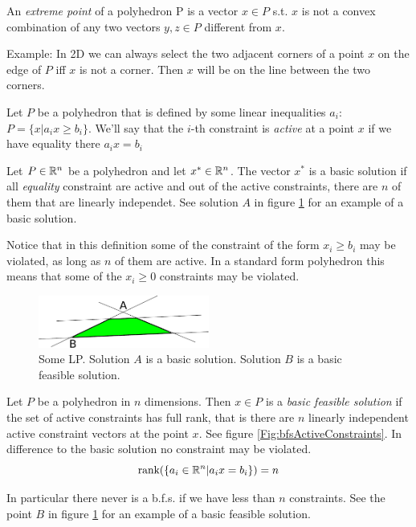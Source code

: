 \begin{Def}\label{Def:ExtremePoint} An \emph{extreme point} of a polyhedron P is a vector $x\in P$ s.t. $x$ is not a convex combination of any two vectors $y,z\in P$ different from $x$. 
\end{Def}
Example: In 2D we can always select the two adjacent corners of a point $x$ on the edge of $P$ iff $x$ is not a corner. Then $x$ will be on the line between the two corners. 

\begin{Def}\label{Def:ActiveConstraint} Let $P$ be a polyhedron that is defined by some linear inequalities $a_i$: $P=\{x|a_ix\geq b_i\}$. We'll say that the $i$-th constraint is \emph{active} at a point $x$ if we have equality there $a_ix = b_i$
\end{Def}
%
\begin{Def}\label{Def:BasicSolution}Let $P\in \mathbb{R}^n$ be a polyhedron and let $x^{*}\in \mathbb{R}^n$. The vector $x^{*}$ is a basic solution if all \emph{equality} constraint are active and out of the active constraints, there are $n$ of them that are linearly independet. See solution $A$ in figure \ref{Fig:bsfVSbs} for an example of a basic solution.
\end{Def}
Notice that in this definition some of the constraint of the form $x_i \geq b_i$ may be violated, as long as $n$ of them are active. In a standard form polyhedron this means that some of the $x_i \geq 0$ constraints may be violated. 

\begin{figure}[hbt]
\begin{center}
\includegraphics[width=0.5\textwidth]{./images/basicVsBasicFeasible.pdf}
\end{center}
\caption{Some LP. Solution $A$ is a basic solution. Solution $B$ is a basic feasible solution.}
\label{Fig:bsfVSbs}
\end{figure}

\begin{Def}\label{Def:BFS} Let $P$ be a polyhedron in $n$ dimensions. Then $x\in P$ is a \emph{basic feasible solution} if the set of active constraints has full rank, that is there are $n$ linearly independent active constraint vectors at the point $x$. See figure \ref{Fig:bfsActiveConstraints}. In difference to the basic solution no constraint may be violated.
\[\mbox{rank}(\{a_i\in \mathbb{R}^n|a_ix=b_i\}) = n\]

In particular there never is a b.f.s. if we have less than $n$ constraints. See the point $B$ in figure \ref{Fig:bsfVSbs} for an example of a basic feasible solution.
\end{Def}

